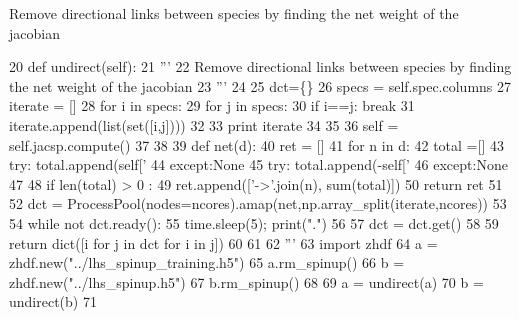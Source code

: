 \begin{DoxyVerb}Remove directional links between species by finding the net weight of the jacobian
\end{DoxyVerb}
 
\begin{DoxyCode}
20 \textcolor{keyword}{def }undirect(self):
21     \textcolor{stringliteral}{'''}
22 \textcolor{stringliteral}{    Remove directional links between species by finding the net weight of the jacobian}
23 \textcolor{stringliteral}{    '''}
24 
25     dct=\{\}
26     specs = self.spec.columns
27     iterate = []
28     \textcolor{keywordflow}{for} i \textcolor{keywordflow}{in} specs:
29         \textcolor{keywordflow}{for} j \textcolor{keywordflow}{in} specs:
30             \textcolor{keywordflow}{if} i==j: \textcolor{keywordflow}{break}
31             iterate.append(list(set([i,j])))
32 
33     \textcolor{keywordflow}{print} iterate
34 
35 
36     self = self.jacsp.compute()
37 
38 
39     \textcolor{keyword}{def }net(d):
40         ret = []
41         \textcolor{keywordflow}{for} n \textcolor{keywordflow}{in} d:
42             total =[]
43             \textcolor{keywordflow}{try}: total.append(self[\textcolor{stringliteral}{'%
44             \textcolor{keywordflow}{except}:\textcolor{keywordtype}{None}
45             \textcolor{keywordflow}{try}: total.append(-self[\textcolor{stringliteral}{'%
46             \textcolor{keywordflow}{except}:\textcolor{keywordtype}{None}
47 
48             \textcolor{keywordflow}{if} len(total) > 0 :
49                 ret.append([\textcolor{stringliteral}{'->'}.join(n), sum(total)])
50         \textcolor{keywordflow}{return} ret
51 
52     dct = ProcessPool(nodes=ncores).amap(net,np.array\_split(iterate,ncores))
53 
54     \textcolor{keywordflow}{while} \textcolor{keywordflow}{not} dct.ready():
55          time.sleep(5); print(\textcolor{stringliteral}{"."})
56 
57     dct = dct.get()
58 
59     \textcolor{keywordflow}{return} dict([i \textcolor{keywordflow}{for} j \textcolor{keywordflow}{in} dct \textcolor{keywordflow}{for} i \textcolor{keywordflow}{in} j])
60 
61 
62 \textcolor{stringliteral}{'''}
63 \textcolor{stringliteral}{import zhdf}
64 \textcolor{stringliteral}{a = zhdf.new("../lhs\_spinup\_training.h5")}
65 \textcolor{stringliteral}{a.rm\_spinup()}
66 \textcolor{stringliteral}{b = zhdf.new("../lhs\_spinup.h5")}
67 \textcolor{stringliteral}{b.rm\_spinup()}
68 \textcolor{stringliteral}{}
69 \textcolor{stringliteral}{a = undirect(a)}
70 \textcolor{stringliteral}{b = undirect(b)}
71 \textcolor{stringliteral}{}
}}
\end{DoxyCode}
